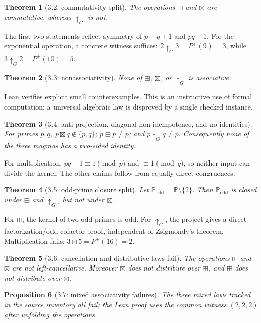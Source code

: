 \documentclass[11pt,a4paper,oneside,open=any,headings=small]{scrbook}
\newtheorem{theorem}{Theorem}[chapter]
\newtheorem{proposition}[theorem]{Proposition}
\theoremstyle{definition}
\newcommand{\Pset}{\mathbb{P}}
\newcommand{\GPF}{P^{+}}
\newcommand{\gexp}{\mathbin{\uparrow_{G}}}
\begin{document}
\begin{theorem}[3.2: commutativity split]
The operations $\boxplus$ and $\boxtimes$ are commutative, whereas $\gexp$ is not.
\end{theorem}
The first two statements reflect symmetry of $p+q+1$ and $pq+1$. For the exponential operation, a concrete witness suffices: $2\gexp3=\GPF(9)=3$, while $3\gexp2=\GPF(10)=5$.

\begin{theorem}[3.3: nonassociativity]
None of $\boxplus$, $\boxtimes$, or $\gexp$ is associative.
\end{theorem}
Lean verifies explicit small counterexamples. This is an instructive use of formal computation: a universal algebraic law is disproved by a single checked instance.

\begin{theorem}[3.4: anti-projection, diagonal non-idempotence, and no identities]
For primes $p,q$, $p\boxtimes q\notin\{p,q\}$; $p\boxplus p\ne p$; and $p\gexp q\ne p$. Consequently none of the three magmas has a two-sided identity.
\end{theorem}
For multiplication, $pq+1\equiv1\pmod p$ and $\equiv1\pmod q$, so neither input can divide the kernel. The other claims follow from equally direct congruences.

\begin{theorem}[3.5: odd-prime closure split]
Let $\Pset_{\mathrm{odd}}=\Pset\setminus\{2\}$. Then $\Pset_{\mathrm{odd}}$ is closed under $\boxplus$ and $\gexp$, but not under $\boxtimes$.
\end{theorem}
For $\boxplus$, the kernel of two odd primes is odd. For $\gexp$, the project gives a direct factorization/odd-cofactor proof, independent of Zsigmondy's theorem. Multiplication fails: $3\boxtimes5=\GPF(16)=2$.

\begin{theorem}[3.6: cancellation and distributive laws fail]
The operations $\boxplus$ and $\boxtimes$ are not left-cancellative. Moreover $\boxtimes$ does not distribute over $\boxplus$, and $\boxplus$ does not distribute over $\boxtimes$.
\end{theorem}

\begin{proposition}[3.7: mixed associativity failures]
The three mixed laws tracked in the source inventory all fail; the Lean proof uses the common witness $(2,2,2)$ after unfolding the operations.
\end{proposition}
\end{document}
